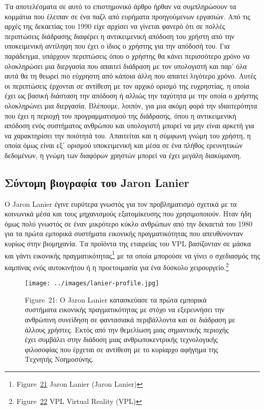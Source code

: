 \documentclass[
]{article}
\begin{document}
Τα αποτελέσματα σε αυτό το επιστημονικό άρθρο ήρθαν να συμπληρώσουν τα
κομμάτια που έλειπαν σε ένα παζλ από ευρήματα προηγούμενων εργασιών. Από
τις αρχές της δεκαετίας του 1990 είχε αρχίσει να γίνεται φανερό ότι σε
πολλές περιπτώσεις διάδρασης διαφέρει η αντικειμενική απόδοση του χρήστη
από την υποκειμενική αντίληψη που έχει ο ίδιος ο χρήστης για την απόδοσή
του. Για παράδειγμα, υπάρχουν περιπτώσεις όπου ο χρήστης θα κάνει
περισσότερο χρόνο να ολοκληρώσει μια διεργασία που απαιτεί διάδραση με
τον υπολογιστή και παρ' όλα αυτά θα τη θεωρεί πιο εύχρηστη από κάποια
άλλη που απαιτεί λιγότερο χρόνο. Αυτές οι περιπτώσεις έρχονται σε
αντίθεση με τον αρχικό ορισμό της ευχρηστίας, η οποία έχει ως βασική
διάσταση την απόδοση ή αλλιώς την ταχύτητα με την οποία ο χρήστης
ολοκληρώνει μια διεργασία. Βλέπουμε, λοιπόν, για μια ακόμη φορά την
ιδιαιτερότητα που έχει η περιοχή του προγραμματισμού της διάδρασης, όπου
η αντικειμενική απόδοση ενός συστήματος ανθρώπου και υπολογιστή μπορεί
να μην είναι αρκετή για να χαρακτηρίσει την ποιότητά του. Απαιτείται και
η σύμφωνη γνώμη του χρήστη, η οποία όμως είναι εξ΄ ορισμού υποκειμενική
και μέσα σε ένα πλήθος ερευνητικών δεδομένων, η γνώμη των διαφόρων
χρηστών μπορεί να έχει μεγάλη διακύμανση.

\hypertarget{ux3c3ux3cdux3bdux3c4ux3bfux3bcux3b7-ux3b2ux3b9ux3bfux3b3ux3c1ux3b1ux3c6ux3afux3b1-ux3c4ux3bfux3c5-jaron-lanier}{%
\subsection{Σύντομη βιογραφία του Jaron
Lanier}\label{ux3c3ux3cdux3bdux3c4ux3bfux3bcux3b7-ux3b2ux3b9ux3bfux3b3ux3c1ux3b1ux3c6ux3afux3b1-ux3c4ux3bfux3c5-jaron-lanier}}

Ο Jaron Lanier έγινε ευρύτερα γνωστός για τον προβληματισμό σχετικά με
τα κοινωνικά μέσα και τους μηχανισμούς εξατομίκευσης που χρησιμοποιούν.
Ηταν ήδη όμως πολύ γνωστός σε έναν μικρότερο κύκλο ανθρώπων από την
δεκαετιά του 1980 για τα πρώτα εμπορικά συστήματα εικονικής
πραγματικότητας που απευθύνονταν κυρίως στην βιομηχανία. Τα προϊόντα της
εταιρείας του VPL βασίζονταν σε μάσκα και γάντι εικονικής
πραγματικότητας\footnote{Figure~\protect\hyperlink{fig:lanier-profile}{21}
  Jaron Lanier (Jaron Lanier)} με τα οποία μπορούσε να γίνει ο
σχεδιασμός της καμπίνας ενός αυτοκινήτου ή η προετοιμασία για ένα
δύσκολο χειρουργείο.\footnote{Figure~\protect\hyperlink{fig:vpl-virtual-reality}{22}
  VPL Virtual Reality (VPL)}

\leavevmode{}%
\begin{figure}
\hypertarget{fig:lanier-profile}{%
\centering
\texttt{[image: ../images/lanier-profile.jpg]}
\caption{Figure~21: Ο Jaron Lanier κατασκεύασε τα πρώτα εμπορικά
συστήματα εικονικής πραγματικότητας με στόχο να εξερευνήσει την
ανθρώπινη συνείδηση σε φαντασιακά περιβάλλοντα και σε διάδραση με άλλους
χρήστες. Εκτός από την θεμελίωση μιας σημαντικής περιοχής έχει συμβάλει
στην διάδοση μιας ανθρωποκεντρικής τεχνολογικής φιλοσοφίας που έρχεται
σε αντίθεση με το κυρίαρχο αφήγημα της Τεχνητής
Νοημοσύνης.}\label{fig:lanier-profile}
}
\end{figure}
\end{document}
